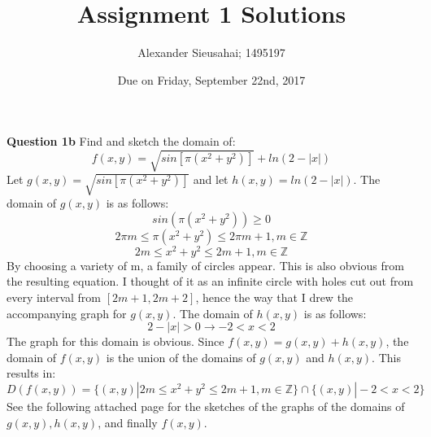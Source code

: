 \documentclass{article}
\author{Alexander Sieusahai; 1495197}
\date{Due on Friday, September 22nd, 2017}
\title{Assignment 1 Solutions}
\begin{document}
\textbf{Question 1b} Find and sketch the domain of:
\[ f(x,y) = \sqrt{sin[\pi(x^2+y^2)]} + ln(2-|x|) \]
Let $g(x,y)=\sqrt{sin[\pi(x^2+y^2)]}$ and let $h(x,y)=ln(2-|x|)$.
The domain of $g(x,y)$ is as follows:
\[ sin(\pi(x^2+y^2)) \geq 0 \]
\[ 2\pi m \leq \pi(x^2+y^2) \leq 2\pi m + 1, m \in \mathbb{Z} \]
\[ 2m \leq x^2+y^2 \leq 2m+1, m \in \mathbb{Z} \]
By choosing a variety of m, a family of circles appear. This is also obvious from the resulting equation. I thought of it as an infinite circle with holes cut out from every interval from $[2m+1,2m+2]$, hence the way that I drew the accompanying graph for $g(x,y)$. The domain of $h(x,y)$ is as follows:
\[ 2-|x| > 0 \rightarrow -2 < x < 2 \]
The graph for this domain is obvious. Since $f(x,y) = g(x,y) + h(x,y)$, the domain of $f(x,y)$ is the union of the domains of $g(x,y)$ and $h(x,y)$. This results in:
\[D(f(x,y)) = \{(x,y)|2m \leq x^2+y^2 \leq 2m+1, m \in \mathbb{Z}\} \cap \{(x,y)|-2<x<2\} \]
See the following attached page for the sketches of the graphs of the domains of $g(x,y), h(x,y)$, and finally $f(x,y)$.
\end{document}
